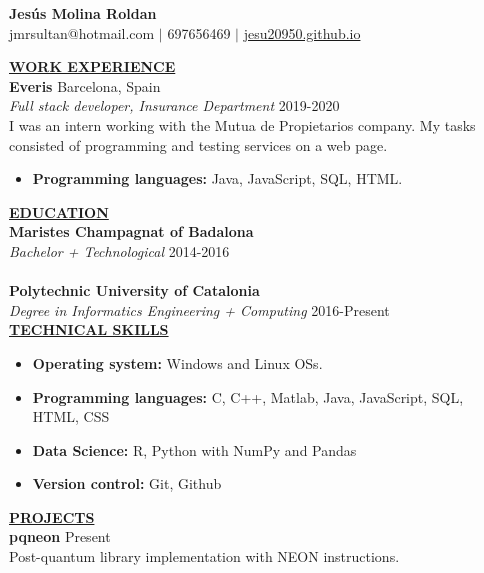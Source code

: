 \documentclass{article}
\begin{document}
	\begin{center}
		\thispagestyle{empty}
		\large \textbf{Jesús Molina Roldan\\}
		\normalsize jmr\textunderscore sultan@hotmail.com $\mid$ 697656469 $\mid$ \href{https://jesu20950.github.io/}{jesu20950.github.io} \\ 
		\hrulefill
	\end{center}
	
	\noindent \textbf{\underline{WORK EXPERIENCE}} \\
	\noindent \textbf{Everis} \hfill Barcelona, Spain \\
	\textit{Full stack developer, Insurance Department} \hfill 2019-2020 \\
	I was an intern working with the Mutua de Propietarios company. My tasks consisted of programming and testing services on a web page.
	\begin{itemize}[noitemsep,nolistsep,leftmargin=*]
		\item {\textbf{Programming languages:} Java, JavaScript, SQL, HTML.}\\
	\end{itemize}
	

	\noindent \textbf{\underline{EDUCATION}} \\
	\textbf{Maristes Champagnat of Badalona} \\
	\textit{Bachelor + Technological}  \hfill 2014-2016  \\ \\
	\textbf{Polytechnic University of Catalonia} \\
	\textit{Degree in Informatics Engineering + Computing}  \hfill 2016-Present \\
	

	\noindent \textbf{\underline{TECHNICAL SKILLS}} \\
	\begin{itemize}[noitemsep,nolistsep,leftmargin=*]
		\item {\textbf{Operating system:} Windows and Linux OSs.}
		\item {\textbf{Programming languages:} C, C++, Matlab, Java, JavaScript, SQL, HTML, CSS}
		\item {\textbf{Data Science:} R, Python with NumPy and Pandas}
		\item {\textbf{Version control:} Git, Github}\\
	\end{itemize}
	
		\noindent \textbf{\underline{PROJECTS}} \\
	\noindent \textbf{pqneon}  \hfill  Present \\
	Post-quantum library implementation with NEON instructions. \\
\end{document}
